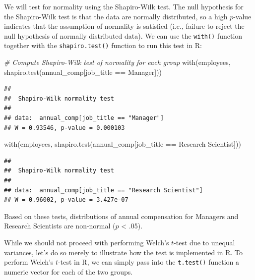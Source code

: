 \documentclass[
]{book}
\newenvironment{Shaded}{\begin{snugshade}}{\end{snugshade}}
\newcommand{\CommentTok}[1]{\textcolor[rgb]{0.56,0.35,0.01}{\textit{#1}}}
\newcommand{\FunctionTok}[1]{\textcolor[rgb]{0.00,0.00,0.00}{#1}}
\newcommand{\NormalTok}[1]{#1}
\newcommand{\SpecialCharTok}[1]{\textcolor[rgb]{0.00,0.00,0.00}{#1}}
\newcommand{\StringTok}[1]{\textcolor[rgb]{0.31,0.60,0.02}{#1}}
\begin{document}
We will test for normality using the Shapiro-Wilk test. The null hypothesis for the Shapiro-Wilk test is that the data are normally distributed, so a high \(p\)-value indicates that the assumption of normality is satisfied (i.e., failure to reject the null hypothesis of normally distributed data). We can use the \texttt{with()} function together with the \texttt{shapiro.test()} function to run this test in R:

\begin{Shaded}
\begin{Highlighting}[]
\CommentTok{\# Compute Shapiro{-}Wilk test of normality for each group}
\FunctionTok{with}\NormalTok{(employees, }\FunctionTok{shapiro.test}\NormalTok{(annual\_comp[job\_title }\SpecialCharTok{==} \StringTok{\textquotesingle{}Manager\textquotesingle{}}\NormalTok{]))}
\end{Highlighting}
\end{Shaded}

\begin{verbatim}
## 
##  Shapiro-Wilk normality test
## 
## data:  annual_comp[job_title == "Manager"]
## W = 0.93546, p-value = 0.000103
\end{verbatim}

\begin{Shaded}
\begin{Highlighting}[]
\FunctionTok{with}\NormalTok{(employees, }\FunctionTok{shapiro.test}\NormalTok{(annual\_comp[job\_title }\SpecialCharTok{==} \StringTok{\textquotesingle{}Research Scientist\textquotesingle{}}\NormalTok{]))}
\end{Highlighting}
\end{Shaded}

\begin{verbatim}
## 
##  Shapiro-Wilk normality test
## 
## data:  annual_comp[job_title == "Research Scientist"]
## W = 0.96002, p-value = 3.427e-07
\end{verbatim}

Based on these tests, distributions of annual compensation for Managers and Research Scientists are non-normal (\(p\) \textless{} .05).

While we should not proceed with performing Welch's \(t\)-test due to unequal variances, let's do so merely to illustrate how the test is implemented in R. To perform Welch's \(t\)-test in R, we can simply pass into the \texttt{t.test()} function a numeric vector for each of the two groups.
\end{document}
